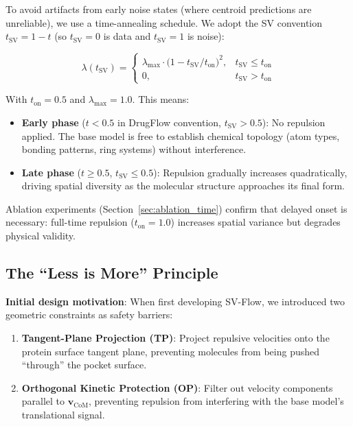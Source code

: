 \documentclass[a4paper,11pt]{article}
\begin{document}
To avoid artifacts from early noise states (where centroid predictions are
unreliable), we use a time-annealing schedule.  We adopt the SV convention
$t_{\text{SV}} = 1 - t$ (so $t_{\text{SV}}=0$ is data and $t_{\text{SV}}=1$ is
noise):

\begin{equation}
\lambda(t_{\text{SV}}) = \begin{cases}
  \lambda_{\text{max}} \cdot \bigl(1 - t_{\text{SV}} / t_{\text{on}}\bigr)^2, & t_{\text{SV}} \leq t_{\text{on}} \\[4pt]
  0, & t_{\text{SV}} > t_{\text{on}}
\end{cases}
\label{eq:annealing}
\end{equation}

With $t_{\text{on}} = 0.5$ and $\lambda_{\text{max}} = 1.0$.  This means:
\begin{itemize}
  \item \textbf{Early phase} ($t < 0.5$ in DrugFlow convention, $t_{\text{SV}} >
    0.5$): No repulsion applied.  The base model is free to establish chemical
    topology (atom types, bonding patterns, ring systems) without interference.
  \item \textbf{Late phase} ($t \geq 0.5$, $t_{\text{SV}} \leq 0.5$): Repulsion
    gradually increases quadratically, driving spatial diversity as the
    molecular structure approaches its final form.
\end{itemize}

Ablation experiments (Section~\ref{sec:ablation_time}) confirm that delayed onset
is necessary: full-time repulsion ($t_{\text{on}} = 1.0$) increases spatial
variance but degrades physical validity.

\subsection{The ``Less is More'' Principle}

\label{sec:less_is_more}

\textbf{Initial design motivation}: When first developing SV-Flow, we introduced
two geometric constraints as safety barriers:

\begin{enumerate}
  \item \textbf{Tangent-Plane Projection (TP)}: Project repulsive velocities
    onto the protein surface tangent plane, preventing molecules from being
    pushed ``through'' the pocket surface.
  \item \textbf{Orthogonal Kinetic Protection (OP)}: Filter out velocity
    components parallel to $\mathbf{v}_{\text{CoM}}$, preventing repulsion from
    interfering with the base model's translational signal.
\end{enumerate}
\end{document}
